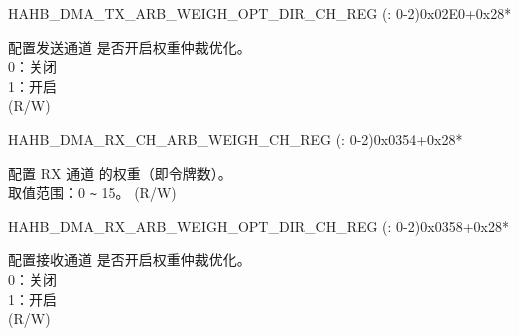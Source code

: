 \begin{register}{H}{AHB\_DMA\_TX\_ARB\_WEIGH\_OPT\_DIR\_CH\_REG (: 0-2)}{0x02E0+0x28*}\label{regdesc:AHBDMATXARBWEIGHOPTDIRCHNREG}
%
%
\regnewline%
\begin{regdesc}\begin{reglist}
\label{fielddesc:AHBDMATXARBWEIGHOPTDIRCHN}\item [AHB\_DMA\_TX\_ARB\_WEIGH\_OPT\_DIR\_CH\regindex{n}] 配置发送通道  是否开启权重仲裁优化。\\
0：关闭\\
1：开启\\ (R/W)
\end{reglist}\end{regdesc}
\end{register}


\begin{register}{H}{AHB\_DMA\_RX\_CH\_ARB\_WEIGH\_CH\_REG (: 0-2)}{0x0354+0x28*}\label{regdesc:AHBDMARXCHARBWEIGHCHNREG}
%
%
\regnewline%
\begin{regdesc}\begin{reglist}
\label{fielddesc:AHBDMARXCHARBWEIGHCHN}\item [AHB\_DMA\_RX\_CH\_ARB\_WEIGH\_CH\regindex{n}] 配置 RX 通道  的权重（即令牌数）。\\取值范围：0 \verb+~+ 15。 (R/W)
\end{reglist}\end{regdesc}
\end{register}


\begin{register}{H}{AHB\_DMA\_RX\_ARB\_WEIGH\_OPT\_DIR\_CH\_REG (: 0-2)}{0x0358+0x28*}\label{regdesc:AHBDMARXARBWEIGHOPTDIRCHNREG}
%
%
\regnewline%
\begin{regdesc}\begin{reglist}
\label{fielddesc:AHBDMARXARBWEIGHOPTDIRCHN}\item [AHB\_DMA\_RX\_ARB\_WEIGH\_OPT\_DIR\_CH\regindex{n}] 配置接收通道  是否开启权重仲裁优化。\\
0：关闭\\
1：开启\\ (R/W)
\end{reglist}\end{regdesc}
\end{register}


